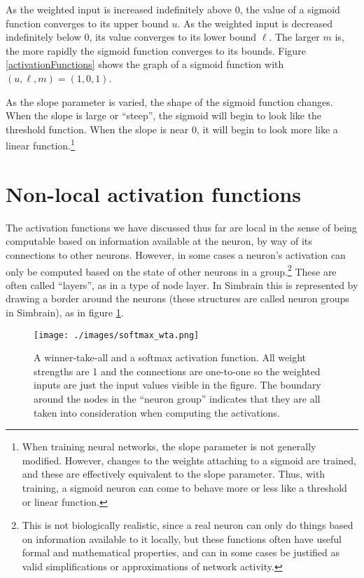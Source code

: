    As the weighted input is increased indefinitely above $0$, the value of a 
sigmoid function converges to its upper bound $u$. As the weighted input is 
decreased indefinitely below $0$, its value converges to its lower bound $\ell$.
The larger $m$ is, the more rapidly the sigmoid function converges to its 
bounds. Figure \ref{activationFunctions} shows the graph of a sigmoid function with 
$(u,\ell,m) = (1,0,1)$. 

As the slope parameter is varied, the shape of the sigmoid function changes. When the slope is
large or ``steep'', the sigmoid will begin to look like the threshold function. When the slope is near $0$, it will begin to look more like a linear function.\footnote{When training neural networks, the slope parameter is not generally modified. However, changes to the weights attaching to a sigmoid are trained, and these are effectively equivalent to the slope parameter. Thus, with training, a sigmoid neuron can come to behave more or less like a threshold or linear function.}

\section{Non-local activation functions}\label{wta_softmax_section}

The activation functions we have discussed thus far are local in the sense of being computable based on information available at the neuron, by way of its connections to other neurons. However, in some cases a neuron's activation can only be computed based on the state of other neurons in a group.\footnote{This is not biologically realistic, since a real neuron can only do things based on information available to it locally, but these functions often have useful formal and mathematical properties, and can in some cases be justified as valid simplifications or approximations of network activity.} These are often called ``layers'', as in a type of node layer. In Simbrain this is represented by drawing a border around the neurons (these structures are called neuron groups in Simbrain), as in figure \ref{wta_softmax}.

\begin{figure}[h]
\centering
\texttt{[image: ./images/softmax\_wta.png]}
\caption[Jeff Yoshimi.]{A winner-take-all and a softmax activation function. All weight strengths are 1 and the connections are one-to-one so the weighted inputs are just the input values visible in the figure. The boundary around the nodes in the ``neuron group'' indicates that they are all taken into consideration when computing the activations.}
\label{wta_softmax}
\end{figure}

